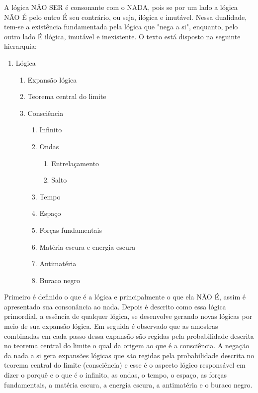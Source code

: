 A lógica NÃO SER é consonante com o NADA, pois se por um lado a lógica NÃO É pelo outro É seu contrário, ou seja, ilógica e imutável. Nessa dualidade, tem-se a existência
fundamentada pela lógica que "nega a si", enquanto, pelo outro lado É ilógica, imutável e
inexistente. O texto está disposto na seguinte hierarquia:
	{\scriptsize
	\begin{enumerate}[label*=\arabic*.]
	   \item Lógica
	   \begin{enumerate}[label*=\arabic*.]
		   \item Expansão lógica
		   \item Teorema central do limite
		   \item Consciência
			   \begin{enumerate}[label*=\arabic*.]
				   \item Infinito
				   \item Ondas 
				   \begin{enumerate}[label*=\arabic*.]
				   		\item Entrelaçamento
				   		\item Salto
				   \end{enumerate}  
				   \item Tempo
				   \item Espaço
				   \item Forças fundamentais
				   \item Matéria escura e energia escura
				   \item Antimatéria
				   \item Buraco negro
			   \end{enumerate}   
	   \end{enumerate}
	\end{enumerate}
	}

Primeiro é definido o que é a lógica e principalmente o que ela NÃO É, assim é apresentado sua consonância ao nada. Depois é descrito como essa lógica primordial, a essência de qualquer lógica, se desenvolve gerando novas lógicas por meio de sua expansão lógica. Em seguida é observado que as amostras combinadas em cada passo dessa expansão são regidas pela probabilidade descrita no teorema central do limite o qual da origem ao que é a consciência. A negação da nada a si gera expansões lógicas que são regidas pela probabilidade descrita no teorema central do limite (consciência) e esse é o aspecto lógico responsável em dizer o porquê e o que é o infinito, as ondas, o tempo, o espaço, as forças fundamentais, a matéria escura, a energia escura, a antimatéria e o buraco negro. 